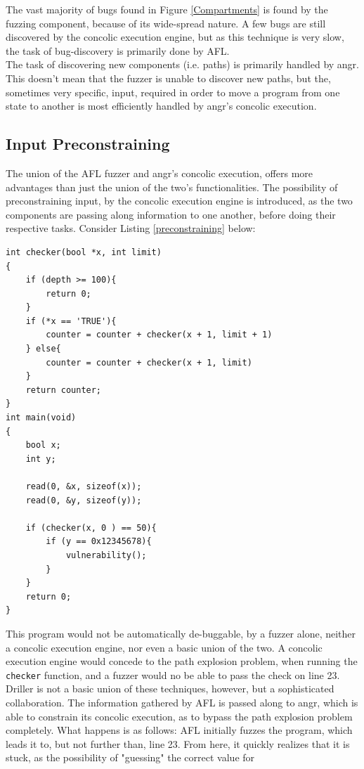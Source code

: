 \documentclass[a4paper]{article}
\newcommand{\ttt}[1]{\texttt{#1}}
\begin{document}
The vast majority of bugs found in Figure \ref{Compartments} is found by the fuzzing component, because of its wide-spread nature. A few bugs are still discovered by the concolic execution engine, but as this technique is very slow, the task of bug-discovery is primarily done by AFL.\\[0.1cm]
The task of discovering new components (i.e. paths) is primarily handled by angr. This doesn't mean that the fuzzer is unable to discover new paths, but the, sometimes very specific, input, required in order to move a program from one state to another is most efficiently handled by angr's concolic execution.
\newpage
\subsection{Input Preconstraining}
\label{sec:preconstraining}
The union of the AFL fuzzer and angr's concolic execution, offers more advantages than just the union of the two's functionalities. The possibility of preconstraining input, by the concolic execution engine is introduced, as the two components are passing along information to one another, before doing their respective tasks. Consider Listing \ref{preconstraining} below:
\begin{lstlisting}[caption=A program in need of preconstraining,
label=preconstraining, captionpos=b]
int checker(bool *x, int limit)
{
    if (depth >= 100){
        return 0;
    }
    if (*x == 'TRUE'){
        counter = counter + checker(x + 1, limit + 1)
    } else{
        counter = counter + checker(x + 1, limit)
    }
    return counter;
} 
int main(void)
{
    bool x;
    int y;
    
    read(0, &x, sizeof(x));
    read(0, &y, sizeof(y));

    if (checker(x, 0 ) == 50){
        if (y == 0x12345678){
            vulnerability();
        }
    }	
    return 0;
}
\end{lstlisting}
This program would not be automatically de-buggable, by a fuzzer alone, neither a concolic execution engine, nor even a basic union of the two. A concolic execution engine would concede to the path explosion problem, when running the \ttt{checker} function, and a fuzzer would no be able to pass the check on line 23. Driller is not a basic union of these techniques, however, but a sophisticated collaboration. The information  gathered by AFL is passed along to angr, which is able to constrain its concolic execution, as to bypass the path explosion problem completely. What happens is as follows: AFL initially fuzzes the program, which leads it to, but not further than, line 23. From here, it quickly realizes that it is stuck, as the possibility of "guessing" the correct value for 
\end{document}
